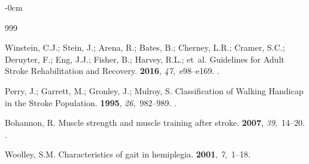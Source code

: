 \documentclass[actuators,article,accept,pdftex,moreauthors]{Definitions/mdpi}
\begin{document}
\begin{adjustwidth}{-\extralength}{0cm}



%



\begin{thebibliography}{999}

Winstein, C.J.; Stein, J.; Arena, R.; Bates, B.; Cherney, L.R.; Cramer, S.C.;
  Deruyter, F.; Eng, J.J.; Fisher, B.; Harvey, R.L.;  et~al.
\newblock Guidelines for Adult Stroke Rehabilitation and Recovery.
 {\bf 2016}, {\em 47},~e98--e169.
.

Perry, J.; Garrett, M.; Gronley, J.; Mulroy, S.
\newblock Classification of Walking Handicap in the Stroke Population.
 {\bf 1995}, {\em
  26},~982--989.
.

Bohannon, R.
\newblock Muscle strength and muscle training after stroke.
 {\bf 2007}, {\em
  39},~14--20.
.

Woolley, S.M.
\newblock Characteristics of gait in hemiplegia.
 {\bf 2001}, {\em 7},~1--18.


\end{thebibliography}
\end{adjustwidth}
\end{document}
